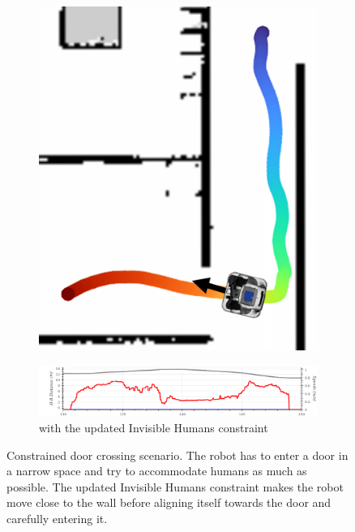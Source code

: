 \begin{figure}[!ht]
\begin{subfigure}{0.3\columnwidth}
  \includegraphics[width=\textwidth]{images/appendix/inv/with.png}
\end{subfigure}
\begin{subfigure}{0.8\columnwidth}
  \includegraphics[width=\textwidth]{images/appendix/inv/with2.png}
  \caption{with the updated Invisible Humans constraint}
\end{subfigure}
\caption{Constrained door crossing scenario. The robot has to enter a door in a narrow space and try to accommodate humans as much as possible. The updated Invisible Humans constraint makes the robot move close to the wall before aligning itself towards the door and carefully entering it.}
\label{fig:door_inv_new}
\end{figure}
